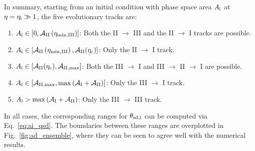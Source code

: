 \documentclass[twocolumn,twocolappendix]{aastex63}
\newcommand*{\p}[1]{\left(#1\right)}
\newcommand*{\s}[1]{\left[#1\right]}
\begin{document}
In summary, starting from an initial condition with phase space area $A_{\rm i}$
at $\eta = \eta_{\rm i} \gg 1$, the five evolutionary tracks are:
\begin{enumerate}
    \item $A_{\rm i} \in \s{0, \mathcal{A}_{\rm II}\p{\eta_{\rm \min, III}}}$:
        Both the II $\to$ III and the II $\to$ I tracks are possible.

    \item $A_{\rm i} \in \s{\mathcal{A}_{\rm II}\p{\eta_{\rm \min, III}},
        \mathcal{A}_{\rm II}(\eta_{\rm c})}$: Only the II $\to$ I track.

    \item $A_{\rm i} \in \s{\mathcal{A}_{\rm II}(\eta_{\rm c}), \mathcal{A}_{\rm
        II, \max}}$: Both the III $\to$ I and III $\to$ II $\to$ I are possible.

    \item $A_{\rm i} \in \s{\mathcal{A}_{\rm II, \max}, \max \p{\mathcal{A}_{\rm
        I} + \mathcal{A}_{\rm II}}}$: Only the III $\to$ I track.

    \item $A_{\rm i} > \max \p{\mathcal{A}_{\rm I} + \mathcal{A}_{\rm II}}$:
        Only the III $\to$ III track.
\end{enumerate}
In all cases, the corresponding ranges for $\theta_{\rm sd,i}$ can be computed via
Eq.~\eqref{eq:ai_qsd}. The boundaries between these ranges are overplotted in
Fig.~\ref{fig:ad_ensemble}, where they can be seen to agree well with the
numerical results.
\end{document}
